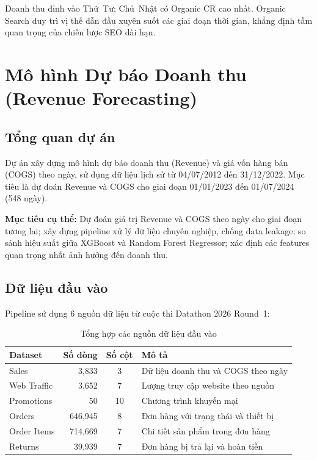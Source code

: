 \documentclass{article}
\begin{document}
Doanh thu đỉnh vào Thứ~Tư; Chủ~Nhật có Organic CR cao nhất. Organic Search duy trì vị thế dẫn đầu xuyên suốt các giai đoạn thời gian, khẳng định tầm quan trọng của chiến lược SEO dài hạn.

\section{Mô hình Dự báo Doanh thu (Revenue Forecasting)}
\label{sec:forecasting}

\subsection{Tổng quan dự án}

Dự án xây dựng mô hình dự báo doanh thu (Revenue) và giá vốn hàng bán (COGS) theo ngày, sử dụng dữ liệu lịch sử từ 04/07/2012 đến 31/12/2022. Mục tiêu là dự đoán Revenue và COGS cho giai đoạn 01/01/2023 đến 01/07/2024 (548 ngày).

\textbf{Mục tiêu cụ thể:} Dự đoán giá trị Revenue và COGS theo ngày cho giai đoạn tương lai; xây dựng pipeline xử lý dữ liệu chuyên nghiệp, chống data leakage; so sánh hiệu suất giữa XGBoost và Random Forest Regressor; xác định các features quan trọng nhất ảnh hưởng đến doanh thu.

\subsection{Dữ liệu đầu vào}

Pipeline sử dụng 6 nguồn dữ liệu từ cuộc thi Datathon 2026 Round~1:

\begin{table}[H]
  \caption{Tổng hợp các nguồn dữ liệu đầu vào}
  \label{tab:data_sources}
  \centering
  \begin{tabular}{lrcl}
    \toprule
    Dataset & Số dòng & Số cột & Mô tả \\
    \midrule
    Sales & 3{,}833 & 3 & Dữ liệu doanh thu và COGS theo ngày \\
    Web Traffic & 3{,}652 & 7 & Lượng truy cập website theo nguồn \\
    Promotions & 50 & 10 & Chương trình khuyến mại \\
    Orders & 646{,}945 & 8 & Đơn hàng với trạng thái và thiết bị \\
    Order Items & 714{,}669 & 7 & Chi tiết sản phẩm trong đơn hàng \\
    Returns & 39{,}939 & 7 & Đơn hàng bị trả lại và hoàn tiền \\
    \bottomrule
  \end{tabular}
\end{table}
\end{document}
